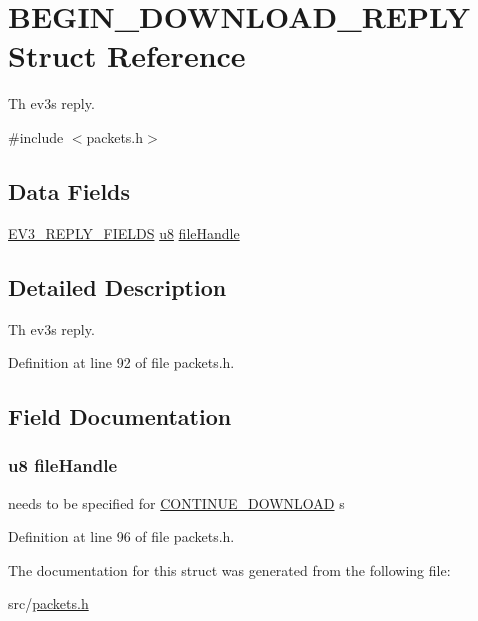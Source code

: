 \hypertarget{struct_b_e_g_i_n___d_o_w_n_l_o_a_d___r_e_p_l_y}{}\section{B\+E\+G\+I\+N\+\_\+\+D\+O\+W\+N\+L\+O\+A\+D\+\_\+\+R\+E\+P\+L\+Y Struct Reference}
\label{struct_b_e_g_i_n___d_o_w_n_l_o_a_d___r_e_p_l_y}


Th ev3\textquotesingle{}s reply.  




{\ttfamily \#include $<$packets.\+h$>$}

\subsection*{Data Fields}
\begin{DoxyCompactItemize}
\item 
\hyperlink{packets_8h_a382c165d520d462ac8f0c88e2a1970cb}{E\+V3\+\_\+\+R\+E\+P\+L\+Y\+\_\+\+F\+I\+E\+L\+D\+S} \hyperlink{defs_8h_a92c50087ca0e64fa93fc59402c55f8ca}{u8} \hyperlink{struct_b_e_g_i_n___d_o_w_n_l_o_a_d___r_e_p_l_y_afdfd867e8243b0ae1e245e467179c567}{file\+Handle}
\end{DoxyCompactItemize}


\subsection{Detailed Description}
Th ev3\textquotesingle{}s reply. 

Definition at line 92 of file packets.\+h.



\subsection{Field Documentation}
\hypertarget{struct_b_e_g_i_n___d_o_w_n_l_o_a_d___r_e_p_l_y_afdfd867e8243b0ae1e245e467179c567}{}
\subsubsection[{file\+Handle}]{ {\bf u8} file\+Handle}\label{struct_b_e_g_i_n___d_o_w_n_l_o_a_d___r_e_p_l_y_afdfd867e8243b0ae1e245e467179c567}
needs to be specified for \hyperlink{struct_c_o_n_t_i_n_u_e___d_o_w_n_l_o_a_d}{C\+O\+N\+T\+I\+N\+U\+E\+\_\+\+D\+O\+W\+N\+L\+O\+A\+D} s 

Definition at line 96 of file packets.\+h.



The documentation for this struct was generated from the following file\+:\begin{DoxyCompactItemize}
\item 
src/\hyperlink{packets_8h}{packets.\+h}\end{DoxyCompactItemize}
